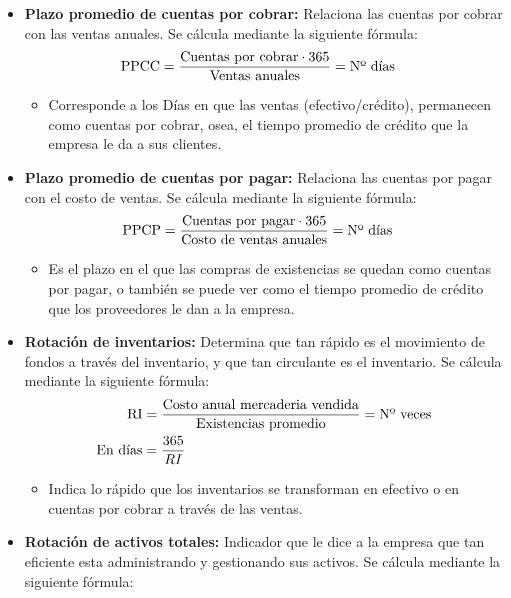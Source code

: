 \documentclass{templateNote}
\begin{document}
\begin{itemize}
    \item \textbf{Plazo promedio de cuentas por cobrar: }Relaciona las cuentas por cobrar con las ventas anuales. Se cálcula mediante la siguiente fórmula:
    \begin{align*}
        \textnormal{PPCC} &= \frac{\textnormal{Cuentas por cobrar} \cdot 365}{\textnormal{Ventas anuales}} = \textnormal{Nº días}
    \end{align*}
    \begin{itemize}
        \item Corresponde a los Días en que las ventas (efectivo/crédito), permanecen como cuentas por cobrar, osea, el tiempo promedio de crédito que la empresa le da a sus clientes.
    \end{itemize}
    \item \textbf{Plazo promedio de cuentas por pagar: }Relaciona las cuentas por pagar con el costo de ventas. Se cálcula mediante la siguiente fórmula:
    \begin{align*}
        \textnormal{PPCP} &= \frac{\textnormal{Cuentas por pagar} \cdot 365}{\textnormal{Costo de ventas anuales}} = \textnormal{Nº días}
    \end{align*}
    \begin{itemize}
        \item Es el plazo en el que las compras de existencias se quedan como cuentas por pagar, o también se puede ver como el tiempo promedio de crédito que los proveedores le dan a la empresa.
    \end{itemize}
    \item \textbf{Rotación de inventarios: }Determina que tan rápido es el movimiento de fondos a través del inventario, y que tan circulante es el inventario. Se cálcula mediante la siguiente fórmula:
    \begin{align*}
        \textnormal{RI} &= \frac{\textnormal{Costo anual mercaderia vendida}}{\textnormal{Existencias promedio}} = \textnormal{Nº veces} \\
        \textnormal{En días} &= \frac{365}{RI}
    \end{align*}
    \begin{itemize}
        \item Indica lo rápido que los inventarios se transforman en efectivo o en cuentas por cobrar a través de las ventas.
    \end{itemize}
    \item \textbf{Rotación de activos totales:} Indicador que le dice a la empresa que tan eficiente esta administrando y gestionando sus activos. Se cálcula mediante la siguiente fórmula:

\end{itemize}
\end{document}
